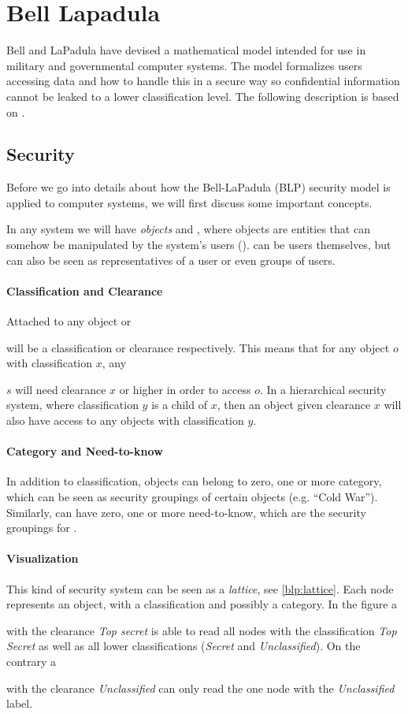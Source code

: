 \section{Bell Lapadula}

Bell and LaPadula have devised a mathematical model intended for use in  military and governmental computer systems.
The model formalizes users accessing data and how to handle this in a secure way so confidential information cannot be leaked to a lower classification level.
The following description is based on \citet{lapadula1996secure}.

\subsection{Security}
Before we go into details about how the Bell-LaPadula (BLP) security model is applied to computer systems, we will first discuss some important concepts.

In any system we will have \textit{objects} and \textit{\subjects{}}, where objects are entities that can somehow be manipulated by the system's users (\subjects{}).
\Subjects{} can be users themselves, but can also be seen as representatives of a user or even groups of users.

\paragraph{Classification and Clearance}
Attached to any object or \subject{} will be a classification or clearance respectively.
This means that for any object $o$ with classification $x$, any \subject{} $s$ will need clearance $x$ or higher in order to access $o$.
In a hierarchical security system, where classification $y$ is a child of $x$, then an object given clearance $x$ will also have access to any objects with classification $y$.

\paragraph{Category and Need-to-know}
In addition to classification, objects can belong to zero, one or more category, which can be seen as security groupings of certain objects (e.g. ``Cold War'').
Similarly, \subjects{} can have zero, one or more need-to-know, which are the security groupings for \subjects{}.

\paragraph{Visualization}
This kind of security system can be seen as a \textit{lattice}, see \cref{blp:lattice}.
Each node represents an object, with a classification and possibly a category.
In the figure a \subject{} with the clearance \emph{Top secret} is able to read all nodes with the classification \emph{Top Secret} as well as all lower classifications (\emph{Secret} and \emph{Unclassified}).
On the contrary a \subject{} with the clearance \emph{Unclassified} can only read the one node with the \emph{Unclassified} label.


